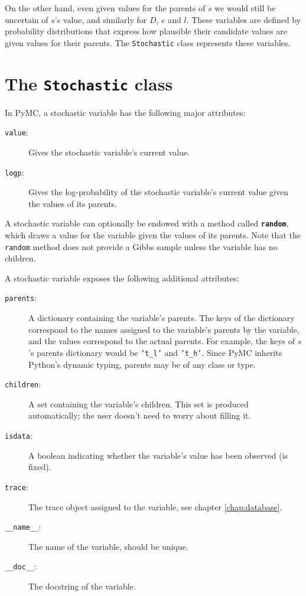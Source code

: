 On the other hand, even given values for the parents of $s$ we would still be uncertain of $s$'s value, and similarly for $D$, $e$ and $l$. These variables are defined by probability distributions that express how plausible their candidate values are given values for their parents. The \texttt{Stochastic} class represents these variables.
 

\section{The \texttt{Stochastic} class}

In PyMC, a stochastic variable has the following major attributes: 
\begin{description}
    \item[\texttt{value}:] Gives the stochastic variable's current value.
    \item[\texttt{logp}:] Gives the log-probability of the stochastic variable's current value given the values of its parents.
\end{description}
A stochastic variable can optionally be endowed with a method called \texttt{\bfseries random}, which draws a value for the variable given the values of its parents. Note that the \texttt{random} method does not provide a Gibbs sample unless the variable has no children.

A stochastic variable exposes the following additional attributes:
\begin{description}
    \item[\texttt{parents}:] A dictionary containing the variable's parents. The keys of the dictionary correspond to the names assigned to the variable's parents by the variable, and the values correspond to the actual parents. For example, the keys of $s$'s parents dictionary would be \texttt{'t\_l'} and \texttt{'t\_h'}. Since PyMC inherits Python's dynamic typing, parents may be of any class or type.
    \item[\texttt{children}:] A set containing the variable's children. This set is produced automatically; the user doesn't need to worry about filling it.
    \item[\texttt{isdata}:] A boolean indicating whether the variable's value has been observed (is fixed).
    \item[\texttt{trace}:] The trace object assigned to the variable, see chapter \ref{chap:database}.
    \item[\texttt{\_\_name\_\_}:] The name of the variable, should be unique.
    \item[\texttt{\_\_doc\_\_}:] The docstring of the variable.
\end{description}

